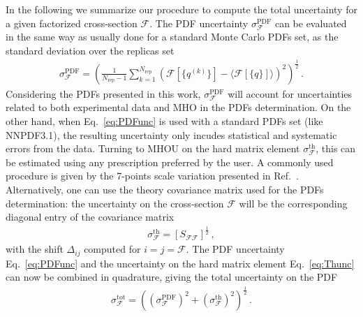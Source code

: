     In the following we summarize our procedure to compute the total uncertainty for a given factorized
    cross-section $\mathcal{F}$.
    The PDF uncertainty $\sigma_{\mathcal{F}}^{\text{PDF}}$ can be evaluated in the same way as usually done
    for a standard Monte Carlo PDFs set, as the standard deviation over the replicas set
    \begin{align}
        \label{eq:PDFunc}
        \sigma_{\mathcal{F}}^{\text{PDF}} = 
        \left(\frac{1}{N_{\text{rep}}-1} \sum_{k=1}^{N_{\text{rep}}}
        \left(\mathcal{F}\left[\{q^{(k)}\}\right]-\langle \mathcal{F}\left[\{q\}\right] \rangle\right)^2
         \right)^{\frac{1}{2}}\,.
    \end{align}
    Considering the PDFs presented in this work, $\sigma_{\mathcal{F}}^{\text{PDF}}$ will account for
    uncertainties related to both experimental data and MHO in the PDFs determination.
    On the other hand, when Eq.~\ref{eq:PDFunc} is used with a standard PDFs set (like NNPDF3.1), the resulting
    uncertainty only incudes statistical and systematic errors from the data. 
    Turning to MHOU on the hard matrix element $\sigma_{\mathcal{F}}^{\text{th}}$,
    this can be estimated using any prescription preferred by the user.
    A commonly used procedure is given by the 7-points scale variation presented in Ref.~\cite{deFlorian:2016spz}.
    Alternatively, one can use the theory covariance matrix used for the PDFs determination: the uncertainty 
    on the cross-section $\mathcal{F}$ will be the corresponding diagonal entry of the covariance matrix
    \begin{align}
        \label{eq:Thunc}
        \sigma_{\mathcal{F}}^{\text{th}} = \left[S_{\mathcal{F}\mathcal{F}}\right]^{\frac{1}{2}}\,,
    \end{align} 
    with the shift $\Delta_{ij}$ computed for $i=j = \mathcal{F}$.
    The PDF uncertainty Eq.~\ref{eq:PDFunc} and the uncertainty on the hard matrix element Eq.~\ref{eq:Thunc}
    can now be combined in quadrature, giving the total uncertainty on the PDF
    \begin{align}
        \label{eq:TOTunc}
        \sigma_{\mathcal{F}}^{\text{tot}} 
        = \left(\left(\sigma_{\mathcal{F}}^{\text{PDF}}\right)^2 +
        \left(\sigma_{\mathcal{F}}^{\text{th}}\right)^2\right)^{\frac{1}{2}}\,.
    \end{align}



    

    
    
